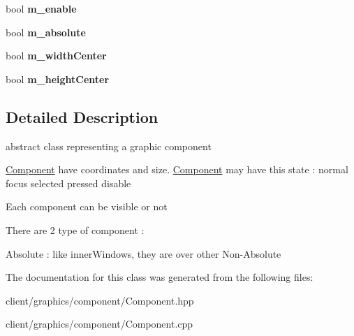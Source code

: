 \begin{DoxyCompactItemize}
\item 
\hypertarget{classgraphics_1_1_component_acb0e4bedd5e90109c23abdc4de194bbc}{bool {\bfseries m\-\_\-enable}}\label{classgraphics_1_1_component_acb0e4bedd5e90109c23abdc4de194bbc}

\item 
\hypertarget{classgraphics_1_1_component_ad55902a1593aa03984beee19af2bb634}{bool {\bfseries m\-\_\-absolute}}\label{classgraphics_1_1_component_ad55902a1593aa03984beee19af2bb634}

\item 
\hypertarget{classgraphics_1_1_component_a2a26ed2d0dac17a80ac0a08ae09e4142}{bool {\bfseries m\-\_\-width\-Center}}\label{classgraphics_1_1_component_a2a26ed2d0dac17a80ac0a08ae09e4142}

\item 
\hypertarget{classgraphics_1_1_component_ad05720d003278942086177135e258f50}{bool {\bfseries m\-\_\-height\-Center}}\label{classgraphics_1_1_component_ad05720d003278942086177135e258f50}

\end{DoxyCompactItemize}


\subsection{Detailed Description}
abstract class representing a graphic component 

\hyperlink{classgraphics_1_1_component}{Component} have coordinates and size. \hyperlink{classgraphics_1_1_component}{Component} may have this state \-: normal focus selected pressed disable

Each component can be visible or not

There are 2 type of component \-:

Absolute \-: like inner\-Windows, they are over other Non-\/\-Absolute 

The documentation for this class was generated from the following files\-:\begin{DoxyCompactItemize}
\item 
client/graphics/component/Component.\-hpp\item 
client/graphics/component/Component.\-cpp\end{DoxyCompactItemize}
